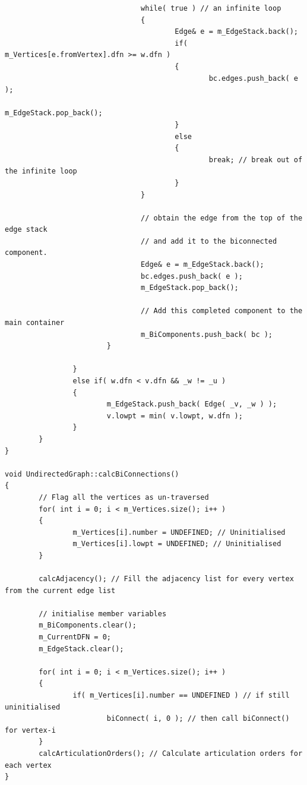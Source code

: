 \begin{lstlisting}
                                while( true ) // an infinite loop
                                {
                                        Edge& e = m_EdgeStack.back();
                                        if( m_Vertices[e.fromVertex].dfn >= w.dfn )
                                        {
                                                bc.edges.push_back( e );
                                                m_EdgeStack.pop_back();
                                        }
                                        else
                                        {
                                                break; // break out of the infinite loop
                                        }
                                }

                                // obtain the edge from the top of the edge stack 
                                // and add it to the biconnected component.
                                Edge& e = m_EdgeStack.back();
                                bc.edges.push_back( e );
                                m_EdgeStack.pop_back();

                                // Add this completed component to the main container
                                m_BiComponents.push_back( bc );
                        }

                }
                else if( w.dfn < v.dfn && _w != _u )
                {
                        m_EdgeStack.push_back( Edge( _v, _w ) );
                        v.lowpt = min( v.lowpt, w.dfn );
                }
        }               
}

void UndirectedGraph::calcBiConnections()
{
        // Flag all the vertices as un-traversed
        for( int i = 0; i < m_Vertices.size(); i++ )
        {
                m_Vertices[i].number = UNDEFINED; // Uninitialised
                m_Vertices[i].lowpt = UNDEFINED; // Uninitialised                       
        }
        
        calcAdjacency(); // Fill the adjacency list for every vertex from the current edge list

        // initialise member variables
        m_BiComponents.clear();
        m_CurrentDFN = 0;
        m_EdgeStack.clear();
        
        for( int i = 0; i < m_Vertices.size(); i++ )
        {
                if( m_Vertices[i].number == UNDEFINED ) // if still uninitialised
                        biConnect( i, 0 ); // then call biConnect() for vertex-i
        }
        calcArticulationOrders(); // Calculate articulation orders for each vertex
}
\end{lstlisting}

